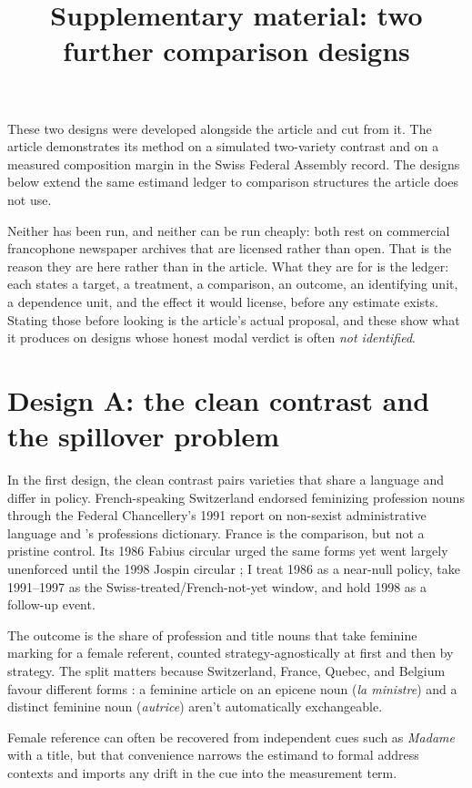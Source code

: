 \documentclass[11pt]{article}
\title{Supplementary material: two further comparison designs}
\author{}
\date{}
\newcommand{\mention}[1]{\textit{#1}}
\begin{document}
\maketitle

These two designs were developed alongside the article and cut from it. The article
demonstrates its method on a simulated two-variety contrast and on a measured
composition margin in the Swiss Federal Assembly record. The designs below extend the
same estimand ledger to comparison structures the article does not use.

Neither has been run, and neither can be run cheaply: both rest on commercial
francophone newspaper archives that are licensed rather than open. That is the reason
they are here rather than in the article. What they are for is the ledger: each states
a target, a treatment, a comparison, an outcome, an identifying unit, a dependence unit,
and the effect it would license, before any estimate exists. Stating those before
looking is the article's actual proposal, and these show what it produces on designs
whose honest modal verdict is often \emph{not identified}.

\section*{Design A: the clean contrast and the spillover problem}

In the first design, the clean contrast pairs varieties that share a language and differ in policy. French-speaking Switzerland endorsed feminizing profession nouns through the Federal Chancellery's 1991 report on non-sexist administrative language \citep{chancellerie1991} and \textcite{Moreau1991}'s professions dictionary. France is the comparison, but not a pristine control. Its 1986 Fabius circular urged the same forms yet went largely unenforced until the 1998 Jospin circular \citep{BurnettBonami2019}; I treat 1986 as a near-null policy, take 1991--1997 as the Swiss-treated/French-not-yet window, and hold 1998 as a follow-up event.

The outcome is the share of profession and title nouns that take feminine marking for a female referent, counted strategy-agnostically at first and then by strategy. The split matters because Switzerland, France, Quebec, and Belgium favour different forms \citep{Dawes2003}: a feminine article on an epicene noun (\mention{la ministre}) and a distinct feminine noun (\mention{autrice}) aren't automatically exchangeable.

Female reference can often be recovered from independent cues such as \mention{Madame} with a title, but that convenience narrows the estimand to formal address contexts and imports any drift in the cue into the measurement term.
\end{document}
